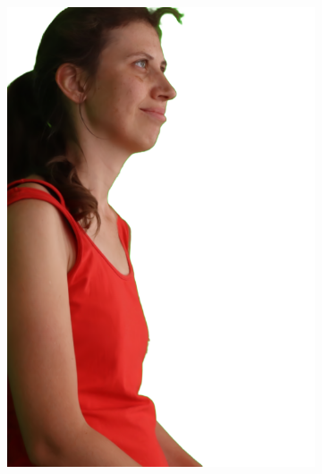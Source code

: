 \begin{figure}[!ht]
    \centering
	\begin{subfigure}{0.12\linewidth}
        \includegraphics[width=\textwidth]{Figures/results/initials/dora/20_render.png}

\end{subfigure}
\end{figure}
